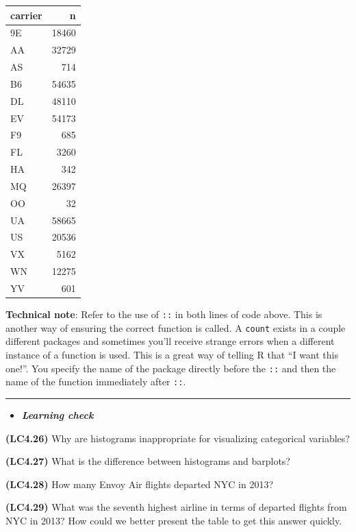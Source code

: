 \documentclass[]{tufte-book}
\let\oldrule=\rule
\renewcommand{\rule}[1]{\oldrule{\linewidth}}
\newenvironment{rmdblock}[1]
  {\begin{shaded*}
  \begin{itemize}
  \renewcommand{\labelitemi}{
    \raisebox{-.7\height}[0pt][0pt]{
    }
  }
  \item
  }
  {
  \end{itemize}
  \end{shaded*}
  }
\newenvironment{learncheck}
  {\begin{rmdblock}{warning}}
  {\end{rmdblock}}
\begin{document}
\begin{tabular}{l|r}
\hline
carrier & n\\
\hline
9E & 18460\\
\hline
AA & 32729\\
\hline
AS & 714\\
\hline
B6 & 54635\\
\hline
DL & 48110\\
\hline
EV & 54173\\
\hline
F9 & 685\\
\hline
FL & 3260\\
\hline
HA & 342\\
\hline
MQ & 26397\\
\hline
OO & 32\\
\hline
UA & 58665\\
\hline
US & 20536\\
\hline
VX & 5162\\
\hline
WN & 12275\\
\hline
YV & 601\\
\hline
\end{tabular}

\textbf{Technical note}: Refer to the use of \texttt{::} in both lines
of code above. This is another way of ensuring the correct function is
called. A \texttt{count} exists in a couple different packages and
sometimes you'll receive strange errors when a different instance of a
function is used. This is a great way of telling R that ``I want this
one!''. You specify the name of the package directly before the
\texttt{::} and then the name of the function immediately after
\texttt{::}.

\begin{center}\rule{0.5\linewidth}{\linethickness}\end{center}

\begin{learncheck}
\textbf{\emph{Learning check}}
\end{learncheck}

\textbf{(LC4.26)} Why are histograms inappropriate for visualizing
categorical variables?

\textbf{(LC4.27)} What is the difference between histograms and
barplots?

\textbf{(LC4.28)} How many Envoy Air flights departed NYC in 2013?

\textbf{(LC4.29)} What was the seventh highest airline in terms of
departed flights from NYC in 2013? How could we better present the table
to get this answer quickly.
\end{document}
